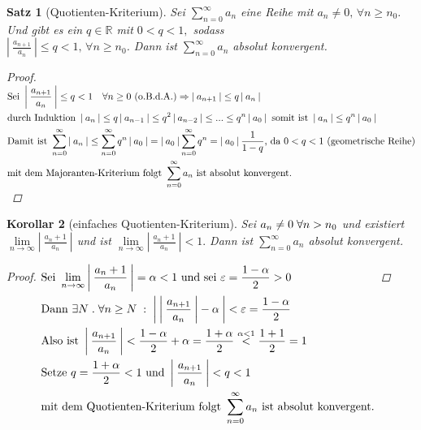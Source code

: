\documentclass[a4paper,titlepage,oneside]{article}
\def\R{\ensuremath{\mathbb{R}} }
\renewcommand{\epsilon}{\ensuremath{\varepsilon} }
\def\fa{\ensuremath{\forall}}
\def\sp{\hspace{0,1cm}}
\def\spdot{\sp.\sp}
\def\spcolon{\sp:\sp}
\newcommand{\suminf}[2][n]{\ensuremath{\sum_{#1= 0}^{\infty}{#2}}}
\renewcommand{\liminf}[2][n]{\ensuremath{\lim\limits_{#1 \rightarrow \infty}{#2}}}
\newcommand{\abs}[1]{\ensuremath{\left|\:#1\:\right|}}
\theoremstyle{thmstyle}
\newtheorem{satz}{Satz}[section]
\newtheorem{korr}[satz]{Korollar}
\theoremstyle{subthmstyle}
\begin{document}
\begin{satz}[Quotienten-Kriterium]
Sei $\displaystyle \suminf{a_n}$ eine Reihe mit $ a_n \ne 0,\, \forall n \ge n_0.$ Und gibt es ein $ q\in \R $ mit $  0 < q < 1, $ sodass \\
$ \displaystyle \abs{\frac{a_{n+1}}{a_n}} \le q < 1,\, \forall n \ge n_0 $. Dann ist $ \displaystyle \suminf{a_n} $ absolut konvergent.
\begin{proof}
\begin{math}\displaystyle \begin{aligned}[t]
&\text{Sei } \abs{\frac{a_{n+1}}{a_n}} \le q < 1 \quad \forall n \ge 0 \text{ (o.B.d.A.)} \Rightarrow \abs{a_{n+1}} \le q \abs{a_n} \\
&\text{durch Induktion } \abs{a_n} \le q\abs{a_{n-1}} \le q^2 \abs{a_{n-2}} \le ... \le q^n \abs{a_0} \text{ somit ist } \abs{a_n} \le q^n \abs{a_0}\\
&\text{Damit ist } \suminf{\abs{a_n}} \le \suminf{q^n \abs{a_0}} = \abs{a_0} \suminf{q^n} = \abs{a_0} \frac{1}{1-q} \text{, da } 0 < q < 1 \text{ (geometrische Reihe)} \\
&\text{mit dem Majoranten-Kriterium folgt } \suminf{a_n} \text{ ist absolut konvergent.}
\end{aligned}\\\end{math}
\end{proof}
\end{satz}

\begin{korr}[einfaches Quotienten-Kriterium]
Sei $  a_n \ne 0 \sp \fa n > n_0 $ und existiert $ \displaystyle  \liminf{\abs{\frac{a_n+1}{a_n}}} $ und ist $ \displaystyle  \liminf{\abs{\frac{a_n+1}{a_n}}} < 1. $ Dann ist $  \displaystyle \suminf{a_n} $ absolut konvergent.
\begin{proof}
\begin{math}\displaystyle \begin{aligned}[t]
&\text{Sei } \liminf{\abs{\frac{a_n+1}{a_n}}} = \alpha < 1 \text{ und sei } \epsilon = \frac{1 - \alpha}{2} > 0 \\
&\text{Dann } \exists N \spdot \forall n \ge N \spcolon \abs{\abs{\frac{a_{n+1}}{a_n}} - \alpha} < \epsilon  = \frac{1-\alpha}{2} \\
&\text{Also ist } \abs{\frac{a_{n+1}}{a_n}} < \frac{1-\alpha}{2} + \alpha = \frac{1+\alpha}{2} \overset{\alpha < 1}{<} \frac{1+1}{2} = 1 \\
&\text{Setze } q = \frac{1 + \alpha}{2} < 1 \text{ und } \abs{\frac{a_{n+1}}{a_n}} < q < 1 \\
&\text{mit dem Quotienten-Kriterium folgt }\suminf{a_n} \text{ ist absolut konvergent.}
\end{aligned}\\\end{math} 
\end{proof}
\end{korr}
\end{document}
